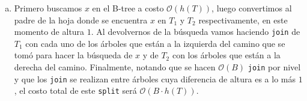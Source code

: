 \documentclass[dcc,uchile]{fcfmcourse}
\theoremstyle{plain}
\theoremstyle{definition}
\begin{document}
\begin{problems}
\begin{enumerate}[a)]
    \item Primero buscamos $x$ en el B-tree a costo $\mathcal{O}(h(T))$, luego convertimos al padre de la hoja donde se encuentra $x$ en $T_{1}$ y $T_{2}$ respectivamente, en este momento de altura $1$.
    Al devolvernos de la búsqueda vamos haciendo \texttt{join} de $T_{1}$ con cada uno de los árboles que están a la izquierda del camino que se tomó para hacer la búsqueda de $x$ y de $T_{2}$ con los árboles que están a la derecha del camino. Finalmente, notando que se hacen $\mathcal{O}(B)$ \texttt{join} por nivel y que los \texttt{join} se realizan entre árboles cuya diferencia de altura es a lo más $1$, el costo total de este \texttt{split} será $\mathcal{O}(B\cdot h(T))$.
\end{enumerate}
\end{problems}
\end{document}
